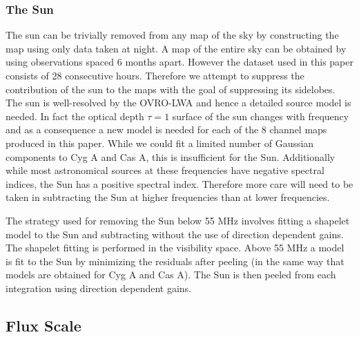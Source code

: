 \documentclass[twocolumn]{aastex61}
\begin{document}
\subsubsection{The Sun}

The sun can be trivially removed from any map of the sky by constructing the map using only data
taken at night. A map of the entire sky can be obtained by using observations spaced 6 months apart.
However the dataset used in this paper consists of 28 consecutive hours. Therefore we attempt to
suppress the contribution of the sun to the maps with the goal of suppressing its sidelobes.  The
sun is well-resolved by the OVRO-LWA and hence a detailed source model is needed. In fact the
optical depth $\tau=1$ surface of the sun changes with frequency and as a consequence a new model is
needed for each of the 8 channel maps produced in this paper. While we could fit a limited number of
Gaussian components to Cyg A and Cas A, this is insufficient for the Sun.  Additionally while most
astronomical sources at these frequencies have negative spectral indices, the Sun has a positive
spectral index. Therefore more care will need to be taken in subtracting the Sun at higher
frequencies than at lower frequencies.

The strategy used for removing the Sun below 55 MHz involves fitting a shapelet
\citep{2003MNRAS.338...35R} model to the Sun and subtracting without the use of direction dependent
gains. The shapelet fitting is performed in the visibility space. Above 55 MHz a model is fit to the
Sun by minimizing the residuals after peeling (in the same way that models are obtained for Cyg A
and Cas A). The Sun is then peeled from each integration using direction dependent gains.

\subsection{Flux Scale}
\end{document}
